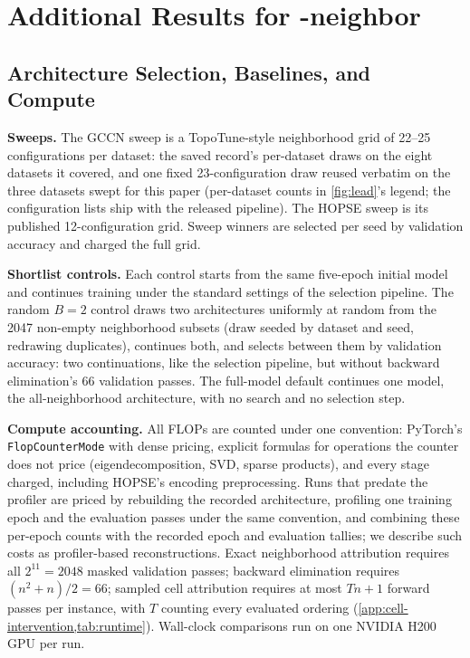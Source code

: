 \section{Additional Results for \method-neighbor}
\label{app:neighbor-results}

\subsection{Architecture Selection, Baselines, and Compute}
\label{app:selection}



\textbf{Sweeps.} The GCCN sweep is a TopoTune-style neighborhood grid
of 22--25 configurations per dataset: the saved record's per-dataset
draws on the eight datasets it covered, and one fixed 23-configuration
draw reused verbatim on the three datasets swept for this paper
(per-dataset counts in \cref{fig:lead}'s legend; the configuration
lists ship with the released pipeline). The HOPSE sweep is its
published 12-configuration grid. Sweep winners are selected per seed
by validation accuracy and charged the full grid.



\textbf{Shortlist controls.} Each control starts from the same
five-epoch initial model and continues training under the standard
settings of the selection pipeline. The random $B{=}2$ control draws
two architectures uniformly at random from the 2047 non-empty
neighborhood subsets (draw seeded by dataset and seed, redrawing
duplicates), continues both, and selects between them by validation
accuracy: two continuations, like the selection pipeline, but without
backward elimination's 66 validation passes. The full-model default
continues one model, the all-neighborhood architecture, with no search
and no selection step.

\textbf{Compute accounting.}
\label{app:flops-conventions}
All FLOPs are counted under one convention: PyTorch's
\texttt{FlopCounterMode} with dense pricing, explicit formulas for
operations the counter does not price (eigendecomposition, SVD, sparse
products), and every stage charged, including HOPSE's encoding
preprocessing. Runs that predate the profiler are priced by rebuilding
the recorded architecture, profiling one training epoch and the
evaluation passes under the same convention, and combining these
per-epoch counts with the recorded epoch and evaluation tallies; we
describe such costs as profiler-based reconstructions. Exact
neighborhood attribution requires all $2^{11} = 2048$ masked
validation passes; backward elimination requires $(n^{2}+n)/2 = 66$;
sampled cell attribution requires at most $Tn + 1$ forward passes per
instance, with $T$ counting every evaluated ordering
(\cref{app:cell-intervention,tab:runtime}). Wall-clock comparisons run
on one NVIDIA H200 GPU per run.

